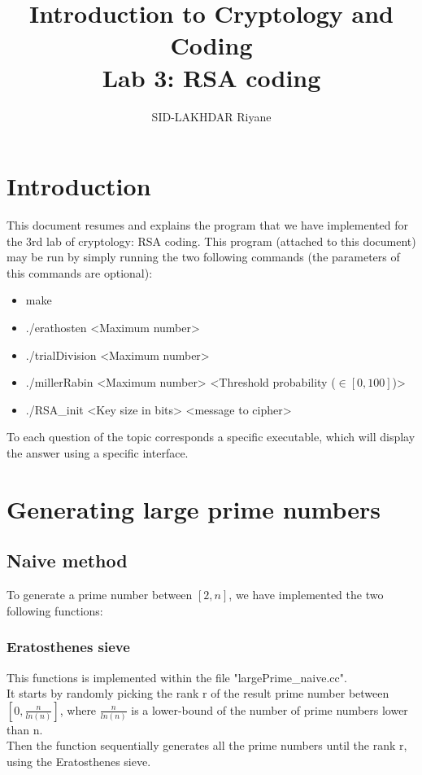 \documentclass[12pt]{article} %
\begin{document}
\author{SID-LAKHDAR Riyane}
\title{Introduction to Cryptology and Coding\\ Lab 3: RSA coding}
\maketitle
\tableofcontents
\newpage


\section{Introduction}
This document resumes and explains the program that we have implemented for the 3rd lab of cryptology: RSA coding.   This program (attached to this document) may be run by simply running the two following commands (the parameters of this commands are optional):
\begin{itemize}
    \item make
    \item ./erathosten <Maximum number>
    \item ./trialDivision <Maximum number>
    \item ./millerRabin <Maximum number> <Threshold probability ($\in [0, 100]$)>
    \item ./RSA\_init <Key size in bits> <message to cipher>
\end{itemize}
To each question of the topic corresponds a specific executable, which will display the answer using a specific interface.\\








\section{Generating large prime numbers}
\subsection{Naive method}
To generate a prime number between $[2, n]$, we have implemented the two following functions:
\subsubsection{Eratosthenes sieve}
This functions is implemented within the file "largePrime\_naive.cc".\\  
It starts by randomly picking the rank r of the result prime number between $[0, \frac{n}{ln(n)}]$, where $\frac{n}{ln(n)}$ is a lower-bound of the number of prime numbers lower than n.\\
Then the function sequentially generates all the prime numbers until the rank r, using the Eratosthenes sieve.\\
\end{document}
